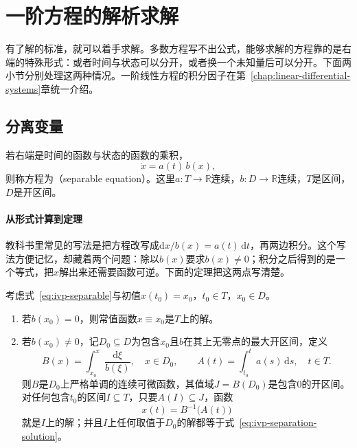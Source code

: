 \section{一阶方程的解析求解}
\label{sec:ivp-first-order}

有了解的标准，就可以着手求解。多数方程写不出公式，能够求解的方程靠的是右端的特殊形式：或者时间与状态可以分开，或者换一个未知量后可以分开。下面两小节分别处理这两种情况。一阶线性方程的积分因子在第~\ref{chap:linear-differential-systems}章统一介绍。

\subsection{分离变量}
\label{sec:ivp-separable}

若右端是时间的函数与状态的函数的乘积，
\begin{equation}
 \dot{x}=a(t)\,b(x),
 \label{eq:ivp-separable}
\end{equation}
则称方程为（separable equation）。这里$a:T\to\mathbb{R}$连续，$b:D\to\mathbb{R}$连续，$T$是区间，$D$是开区间。

\paragraph{从形式计算到定理}
教科书里常见的写法是把方程改写成$\mathrm{d}x/b(x)=a(t)\,\mathrm{d}t$，再两边积分。这个写法方便记忆，却藏着两个问题：除以$b(x)$要求$b(x)\neq 0$；积分之后得到的是一个等式，把$x$解出来还需要函数可逆。下面的定理把这两点写清楚。

\begin{theorem}[分离变量]
 \label{thm:ivp-separation}
 考虑式~\eqref{eq:ivp-separable}与初值$x(t_0)=x_0$，$t_0\in T$，$x_0\in D$。
 \begin{enumerate}
 \item 若$b(x_0)=0$，则常值函数$x\equiv x_0$是$T$上的解。
 \item 若$b(x_0)\neq 0$，记$D_0\subseteq D$为包含$x_0$且$b$在其上无零点的最大开区间，定义
 \begin{equation}
 B(x)=\int_{x_0}^{x}\frac{\mathrm{d}\xi}{b(\xi)},\quad x\in D_0,\qquad
 A(t)=\int_{t_0}^{t}a(s)\,\mathrm{d}s,\quad t\in T.
 \label{eq:ivp-separation-primitives}
 \end{equation}
 则$B$是$D_0$上严格单调的连续可微函数，其值域$J=B(D_0)$是包含$0$的开区间。对任何包含$t_0$的区间$I\subseteq T$，只要$A(I)\subseteq J$，函数
 \begin{equation}
 x(t)=B^{-1}\bigl(A(t)\bigr)
 \label{eq:ivp-separation-solution}
 \end{equation}
 就是$I$上的解；并且$I$上任何取值于$D_0$的解都等于式~\eqref{eq:ivp-separation-solution}。
 \end{enumerate}
\end{theorem}

